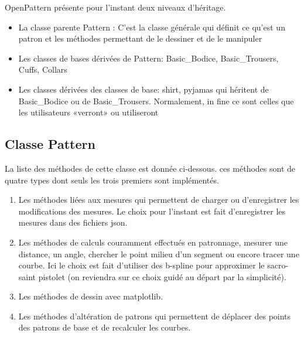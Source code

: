 \documentclass[11pt,a4paper]{article}
\begin{document}
OpenPattern présente pour l'instant deux niveaux d'héritage.
\begin{itemize}
\item La classe parente Pattern : C'est la classe générale qui définit ce qu'est un patron et les méthodes permettant de le dessiner et de le manipuler
\item Les classes de bases dérivées de Pattern: Basic\_Bodice, Basic\_Trousers, Cuffs, Collars
\item Les classes dérivées des classes de base: shirt, pyjamas qui héritent de Basic\_Bodice ou de Basic\_Trousers. Normalement, in fine ce sont celles que les utilisateurs «verront» ou utiliseront	
\end{itemize}


\subsection{Classe Pattern}
La liste des méthodes de cette classe est donnée ci-dessous. ces méthodes sont de quatre types dont seuls les trois premiers sont implémentés.

\begin{enumerate}
\item Les méthodes liées aux mesures qui permettent de charger ou d'enregistrer les modifications des mesures. Le choix pour l'instant est fait d'enregistrer les mesures dans des fichiers json.
\item Les méthodes de calculs couramment effectués en patronnage, mesurer une distance, un angle, chercher le point milieu d'un segment ou encore tracer une courbe. Ici le choix est fait d'utiliser des b-spline pour approximer le sacro-saint pistolet (on reviendra sur ce choix guidé au départ par la simplicité).
\item Les méthodes de dessin avec matplotlib.
\item Les méthodes d'altération de patrons qui permettent de déplacer des points des patrons de base et de recalculer les courbes.
\end{enumerate}
\end{document}
